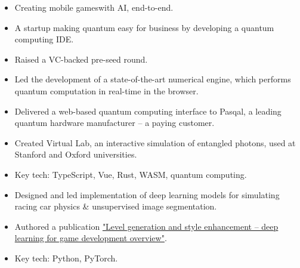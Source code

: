 \documentclass[10pt,a4paper,ragged2e,withhyper]{altacv}
\begin{document}
\begin{paracol}{2}






\begin{itemize}
\item Creating mobile gameswith AI, end-to-end.
\end{itemize}

\begin{itemize}
\item A startup making quantum easy for business by developing a quantum computing IDE.
\item Raised a VC-backed pre-seed round.
\item Led the development of a state-of-the-art numerical engine, which performs quantum computation in real-time in the browser.
\item Delivered a web-based quantum computing interface to Pasqal, a leading quantum hardware manufacturer -- a paying customer.
\item Created Virtual Lab, an interactive simulation of entangled photons, used at Stanford and Oxford universities.
\item Key tech: TypeScript, Vue, Rust, WASM, quantum computing.
\end{itemize}

\divider

\begin{itemize}
\item Designed and led implementation of deep learning models for simulating racing car physics \& unsupervised image segmentation.
\item Authored a publication \href{https://arxiv.org/abs/2107.07397}{"Level generation and style enhancement -- deep learning for game development overview"}.
\item Key tech: Python, PyTorch.
\end{itemize}


\end{paracol}
\end{document}
